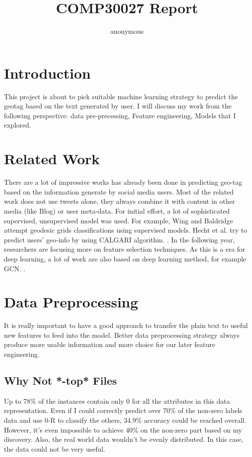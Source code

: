 \documentclass[11pt]{article}
\author{anonymous}
\title{COMP30027 Report}
\begin{document}
\maketitle

\section{Introduction}
This project is about to pick suitable machine learning strategy to
predict the geotag based on the text generated by user. I will discuss my work 
from the following perspective:
data pre-precessing, Feature engineering, Models that I explored.

\section{Related Work}
There are a lot of impressive works has already been done in predicting geo-tag based on the information
generate by social media users. 
Most of the related work does not use tweets alone, they always combine it with content in other
media (like Blog) or user meta-data.
For initial effort, a lot of sophisticated supervised, unsupervised 
model was used. For example, Wing and Baldridge attempt geodesic grids classifications 
using supervised models. Hecht et al. try to predict users' geo-info by using CALGARI algorithm.
. 
In the following year, researchers are focusing more on feature selection techniques. As this is a
era for deep learning, a lot of work are also based on deep learning method, for example GCN.
.


\section{Data Preprocessing}
It is really important to have a good approach to transfer 
the plain text to useful new features to feed into the model.
Better data preprocessing strategy always produce more usable information 
and more choice for our later feature engineering.

\subsection{Why Not *-top* Files}
Up to 78\% of the 
instances contain only 0 for all the attributes in this data representation. 
Even if I could 
correctly predict over 70\% of the non-zero labels data and use 
0-R to classify the others, 34.9\% accuracy could be 
reached overall. However, it's even impossible to achieve
40\% on the non-zero part based on my discovery. Also, the real world
data wouldn't be evenly distributed. In this case, the data could not be very useful.
\end{document}
